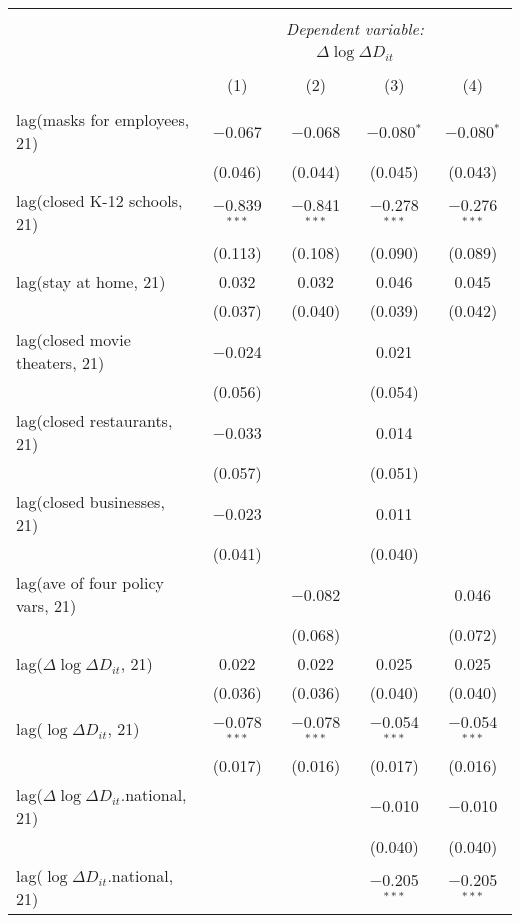 \begin{tabular}{@{\extracolsep{1pt}}lcccc} 
\\[-1.8ex]\hline 
\hline \\[-1.8ex] 
 & \multicolumn{4}{c}{\textit{Dependent variable:}} \\ 
\cline{2-5} 
 & \multicolumn{4}{c}{$\Delta \log \Delta D_{it}$} \\ 
\\[-1.8ex] & (1) & (2) & (3) & (4)\\ 
\hline \\[-1.8ex] 
 lag(masks for employees, 21) & $-$0.067 & $-$0.068 & $-$0.080$^{*}$ & $-$0.080$^{*}$ \\ 
  & (0.046) & (0.044) & (0.045) & (0.043) \\ 
  lag(closed K-12 schools, 21) & $-$0.839$^{***}$ & $-$0.841$^{***}$ & $-$0.278$^{***}$ & $-$0.276$^{***}$ \\ 
  & (0.113) & (0.108) & (0.090) & (0.089) \\ 
  lag(stay at home, 21) & 0.032 & 0.032 & 0.046 & 0.045 \\ 
  & (0.037) & (0.040) & (0.039) & (0.042) \\ 
  lag(closed movie theaters, 21) & $-$0.024 &  & 0.021 &  \\ 
  & (0.056) &  & (0.054) &  \\ 
  lag(closed restaurants, 21) & $-$0.033 &  & 0.014 &  \\ 
  & (0.057) &  & (0.051) &  \\ 
  lag(closed businesses, 21) & $-$0.023 &  & 0.011 &  \\ 
  & (0.041) &  & (0.040) &  \\ 
  lag(ave of four policy vars, 21) &  & $-$0.082 &  & 0.046 \\ 
  &  & (0.068) &  & (0.072) \\ 
  lag($\Delta \log \Delta D_{it}$, 21) & 0.022 & 0.022 & 0.025 & 0.025 \\ 
  & (0.036) & (0.036) & (0.040) & (0.040) \\ 
  lag($\log \Delta D_{it}$, 21) & $-$0.078$^{***}$ & $-$0.078$^{***}$ & $-$0.054$^{***}$ & $-$0.054$^{***}$ \\ 
  & (0.017) & (0.016) & (0.017) & (0.016) \\ 
  lag($\Delta \log \Delta D_{it}$.national, 21) &  &  & $-$0.010 & $-$0.010 \\ 
  &  &  & (0.040) & (0.040) \\ 
  lag($\log \Delta D_{it}$.national, 21) &  &  & $-$0.205$^{***}$ & $-$0.205$^{***}$ \\ 

\end{tabular}
